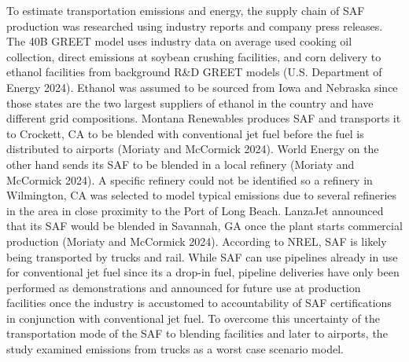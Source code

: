 \documentclass[12pt]{article}
\begin{document}
To estimate transportation emissions and energy, the supply chain of SAF production was researched using industry reports and company press releases. The 40B GREET model uses industry data on average used cooking oil collection, direct emissions at soybean crushing facilities, and corn delivery to ethanol facilities from background R\&D GREET models (U.S. Department of Energy 2024). Ethanol was assumed to be sourced from Iowa and Nebraska since those states are the two largest suppliers of ethanol in the country and have different grid compositions. Montana Renewables produces SAF and transports it to Crockett, CA to be blended with conventional jet fuel before the fuel is distributed to airports (Moriaty and McCormick 2024). World Energy on the other hand sends its SAF to be blended in a local refinery (Moriaty and McCormick 2024). A specific refinery could not be identified so a refinery in Wilmington, CA was selected to model typical emissions due to several refineries in the area in close proximity to the Port of Long Beach. LanzaJet announced that its SAF would be blended in Savannah, GA once the plant starts commercial production (Moriaty and McCormick 2024). According to NREL, SAF is likely being transported by trucks and rail. While SAF can use pipelines already in use for conventional jet fuel since its a drop-in fuel, pipeline deliveries have only been performed as demonstrations and announced for future use at production facilities once the industry is accustomed to accountability of SAF certifications in conjunction with conventional jet fuel. To overcome this uncertainty of the transportation mode of the SAF to blending facilities and later to airports, the study examined emissions from trucks as a worst case scenario model. 
\end{document}
